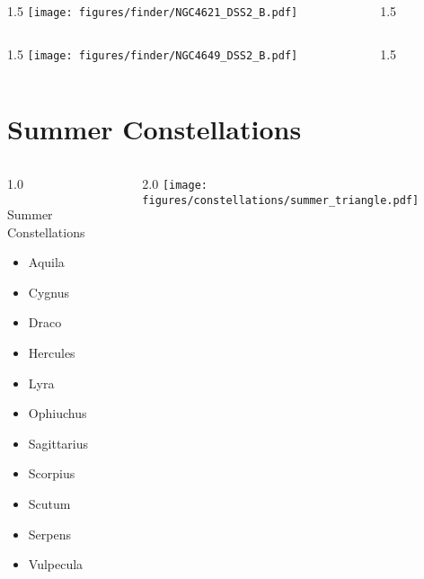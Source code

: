\documentclass[final]{beamer}
\newlength{\colwidth}
\begin{document}

\begin{frame}[t]{}
  \begin{columns}[T]
    \begin{column}{1.5\colwidth}
      \centering
      \texttt{[image: figures/finder/NGC4621\_DSS2\_B.pdf]}
    \end{column}
    \begin{column}{1.5\colwidth}
      \Large
      
    \end{column}
  \end{columns}
  \vspace{\fill}
  \begin{columns}[T]
    \begin{column}{1.5\colwidth}
      \centering
      \texttt{[image: figures/finder/NGC4649\_DSS2\_B.pdf]}
    \end{column}
    \begin{column}{1.5\colwidth}
      \Large
      
    \end{column}
  \end{columns}
\end{frame}

\section{Summer Constellations}

\begin{frame}[t]{}
  \begin{columns}[T]
    \begin{column}{1.0\colwidth}
      \Large
      \begin{block}{Summer Constellations}
        \begin{itemize}
          \item{Aquila}
          \item{Cygnus}
          \item{Draco}
          \item{Hercules}
          \item{Lyra}
          \item{Ophiuchus}
          \item{Sagittarius}
          \item{Scorpius}
          \item{Scutum}
          \item{Serpens}
          \item{Vulpecula}
        \end{itemize}
      \end{block}
    \end{column}
    \begin{column}{2.0\colwidth}
      \centering
      \texttt{[image: figures/constellations/summer\_triangle.pdf]}      \end{column}
  \end{columns}
\end{frame}
\end{document}
